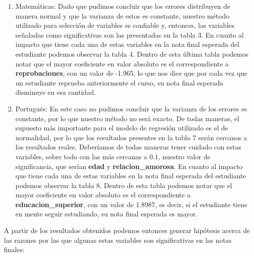 \documentclass[
]{article}
\begin{document}
\begin{enumerate}
\def\labelenumi{\arabic{enumi}.}
\item
  Matemáticas: Dado que pudimos concluir que los errores distribuyen de
  manera normal y que la varianza de estos es constante, nuestro método
  utilizado para selección de variables es confiable y, entonces, las
  variables señaladas como significativas son las presentadas en la
  tabla 3. En cuanto al impacto que tiene cada una de estas variables en
  la nota final esperada del estudiante podemos observar la tabla 4.
  Dentro de esta última tabla podemos notar que el mayor coeficiente en
  valor absoluto es el correspondiente a \textbf{reprobaciones}, con un
  valor de -1.965, lo que nos dice que por cada vez que un estudiante
  reprueba anteriormente el curso, su nota final esperada disminuye en
  esa cantidad.
\item
  Portugués: En este caso no pudimos concluir que la varianza de los
  errores es constante, por lo que nuestro método no será exacto. De
  todas maneras, el supuesto más importante para el modelo de regresión
  utilizado es el de normalidad, por lo que los resultados presentes en
  la tabla 7 serán cercanos a los resultados reales. Deberíamos de todas
  maneras tener cuidado con estas variables, sobre todo con las más
  cercanas a \(0.1\), nuestro valor de significancia, que serían
  \textbf{edad} y \textbf{relacion\_amorosa}. En cuanto al impacto que
  tiene cada una de estas variables en la nota final esperada del
  estudiante podemos observar la tabla 8. Dentro de esta tabla podemos
  notar que el mayor coeficiente en valor absoluto es el correspondiente
  a \textbf{educacion\_superior}, con un valor de 1.8987, es decir, si
  el estudiante tiene en mente seguir estudiando, su nota final esperada
  es mayor.
\end{enumerate}

A partir de los resultados obtenidos podemos entonces generar hipótesis
acerca de las razones por las que algunas estas variables son
significativas en las notas finales:
\end{document}
